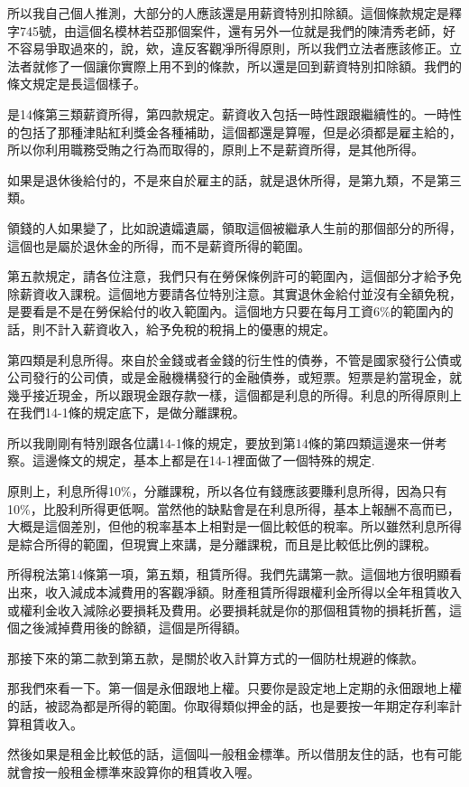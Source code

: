 \documentclass[]{ctexbook}
\begin{document}
所以我自己個人推測，大部分的人應該還是用薪資特別扣除額。這個條款規定是釋字745號，由這個名模林若亞那個案件，還有另外一位就是我們的陳清秀老師，好不容易爭取過來的，說，欸，違反客觀凈所得原則，所以我們立法者應該修正。立法者就修了一個讓你實際上用不到的條款，所以還是回到薪資特別扣除額。我們的條文規定是長這個樣子。

是14條第三類薪資所得，第四款規定。薪資收入包括一時性跟跟繼續性的。一時性的包括了那種津貼紅利獎金各種補助，這個都還是算喔，但是必須都是雇主給的，所以你利用職務受賄之行為而取得的，原則上不是薪資所得，是其他所得。

如果是退休後給付的，不是來自於雇主的話，就是退休所得，是第九類，不是第三類。

領錢的人如果變了，比如說遺孀遺屬，領取這個被繼承人生前的那個部分的所得，這個也是屬於退休金的所得，而不是薪資所得的範圍。

第五款規定，請各位注意，我們只有在勞保條例許可的範圍內，這個部分才給予免除薪資收入課稅。這個地方要請各位特別注意。其實退休金給付並沒有全額免稅，是要看是不是在勞保給付的收入範圍內。這個地方只要在每月工資6\%的範圍內的話，則不計入薪資收入，給予免稅的稅捐上的優惠的規定。

第四類是利息所得。來自於金錢或者金錢的衍生性的債券，不管是國家發行公債或公司發行的公司債，或是金融機構發行的金融債券，或短票。短票是約當現金，就幾乎接近現金，所以跟現金跟存款一樣，這個都是利息的所得。利息的所得原則上在我們14-1條的規定底下，是做分離課稅。

所以我剛剛有特別跟各位講14-1條的規定，要放到第14條的第四類這邊來一併考察。這邊條文的規定，基本上都是在14-1裡面做了一個特殊的規定.

原則上，利息所得10\%，分離課稅，所以各位有錢應該要賺利息所得，因為只有10\%，比股利所得更低啊。當然他的缺點會是在利息所得，基本上報酬不高而已，大概是這個差別，但他的稅率基本上相對是一個比較低的稅率。所以雖然利息所得是綜合所得的範圍，但現實上來講，是分離課稅，而且是比較低比例的課稅。

所得稅法第14條第一項，第五類，租賃所得。我們先講第一款。這個地方很明顯看出來，收入減成本減費用的客觀凈額。財產租賃所得跟權利金所得以全年租賃收入或權利金收入減除必要損耗及費用。必要損耗就是你的那個租賃物的損耗折舊，這個之後減掉費用後的餘額，這個是所得額。

那接下來的第二款到第五款，是關於收入計算方式的一個防杜規避的條款。

那我們來看一下。第一個是永佃跟地上權。只要你是設定地上定期的永佃跟地上權的話，被認為都是所得的範圍。你取得類似押金的話，也是要按一年期定存利率計算租賃收入。

然後如果是租金比較低的話，這個叫一般租金標準。所以借朋友住的話，也有可能就會按一般租金標準來設算你的租賃收入喔。
\end{document}
